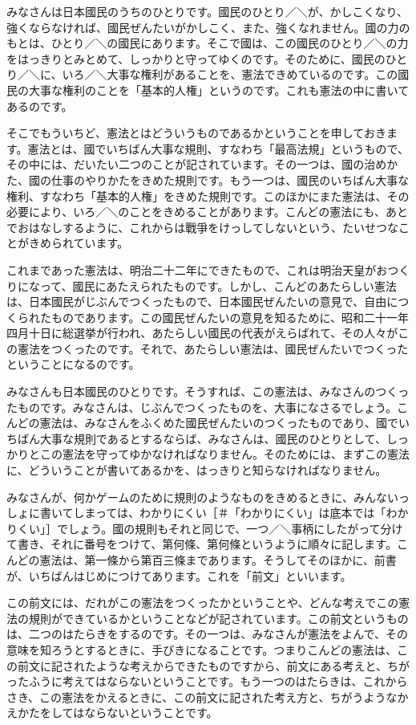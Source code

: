 \documentclass{article}
\begin{document}
\begin{multicols}{2}
みなさんは日本國民のうちのひとりです。國民のひとり／＼が、かしこくなり、強くならなければ、國民ぜんたいがかしこく、また、強くなれません。國の力のもとは、ひとり／＼の國民にあります。そこで國は、この國民のひとり／＼の力をはっきりとみとめて、しっかりと守ってゆくのです。そのために、國民のひとり／＼に、いろ／＼大事な権利があることを、憲法できめているのです。この國民の大事な権利のことを「基本的人権」というのです。これも憲法の中に書いてあるのです。


そこでもういちど、憲法とはどういうものであるかということを申しておきます。憲法とは、國でいちばん大事な規則、すなわち「最高法規」というもので、その中には、だいたい二つのことが記されています。その一つは、國の治めかた、國の仕事のやりかたをきめた規則です。もう一つは、國民のいちばん大事な権利、すなわち「基本的人権」をきめた規則です。このほかにまた憲法は、その必要により、いろ／＼のことをきめることがあります。こんどの憲法にも、あとでおはなしするように、これからは戰爭をけっしてしないという、たいせつなことがきめられています。


これまであった憲法は、明治二十二年にできたもので、これは明治天皇がおつくりになって、國民にあたえられたものです。しかし、こんどのあたらしい憲法は、日本國民がじぶんでつくったもので、日本國民ぜんたいの意見で、自由につくられたものであります。この國民ぜんたいの意見を知るために、昭和二十一年四月十日に総選挙が行われ、あたらしい國民の代表がえらばれて、その人々がこの憲法をつくったのです。それで、あたらしい憲法は、國民ぜんたいでつくったということになるのです。


みなさんも日本國民のひとりです。そうすれば、この憲法は、みなさんのつくったものです。みなさんは、じぶんでつくったものを、大事になさるでしょう。こんどの憲法は、みなさんをふくめた國民ぜんたいのつくったものであり、國でいちばん大事な規則であるとするならば、みなさんは、國民のひとりとして、しっかりとこの憲法を守ってゆかなければなりません。そのためには、まずこの憲法に、どういうことが書いてあるかを、はっきりと知らなければなりません。


みなさんが、何かゲームのために規則のようなものをきめるときに、みんないっしょに書いてしまっては、わかりにくい［＃「わかりにくい」は底本では「わかりくい」］でしょう。國の規則もそれと同じで、一つ／＼事柄にしたがって分けて書き、それに番号をつけて、第何條、第何條というように順々に記します。こんどの憲法は、第一條から第百三條まであります。そうしてそのほかに、前書が、いちばんはじめにつけてあります。これを「前文」といいます。


この前文には、だれがこの憲法をつくったかということや、どんな考えでこの憲法の規則ができているかということなどが記されています。この前文というものは、二つのはたらきをするのです。その一つは、みなさんが憲法をよんで、その意味を知ろうとするときに、手びきになることです。つまりこんどの憲法は、この前文に記されたような考えからできたものですから、前文にある考えと、ちがったふうに考えてはならないということです。もう一つのはたらきは、これからさき、この憲法をかえるときに、この前文に記された考え方と、ちがうようなかえかたをしてはならないということです。

\end{multicols}
\end{document}
